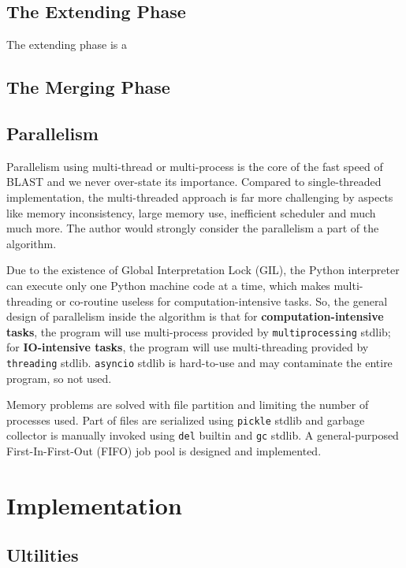 \documentclass[10pt,final,journal,twocolumn,a4paper]{IEEEtran}
\begin{document}
\subsection{The \textbf{Extending} Phase}

The extending phase is a

\subsection{The \textbf{Merging} Phase}

\subsection{Parallelism}

Parallelism using multi-thread or multi-process is the core of the fast speed of BLAST and we never over-state its importance. Compared to single-threaded implementation, the multi-threaded approach is far more challenging by aspects like memory inconsistency, large memory use, inefficient scheduler and much much more. The author would strongly consider the parallelism a part of the algorithm.

Due to the existence of Global Interpretation Lock (GIL), the Python interpreter can execute only one Python machine code at a time, which makes multi-threading or co-routine useless for computation-intensive tasks. So, the general design of parallelism inside the algorithm is that for \textbf{computation-intensive tasks}, the program will use multi-process provided by \verb|multiprocessing| stdlib; for \textbf{IO-intensive tasks}, the program will use multi-threading provided by \verb|threading| stdlib. \verb|asyncio| stdlib is hard-to-use and may contaminate the entire program, so not used.

Memory problems are solved with file partition and limiting the number of processes used. Part of files are serialized using \verb|pickle| stdlib and garbage collector is manually invoked using \verb|del| builtin and \verb|gc| stdlib. A general-purposed First-In-First-Out (FIFO) job pool is designed and implemented.

\section{Implementation}

\subsection{Ultilities}
\end{document}
